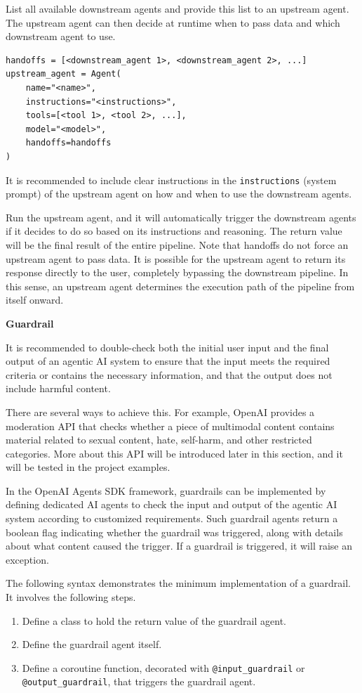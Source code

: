List all available downstream agents and provide this list to an upstream agent. The upstream agent can then decide at runtime when to pass data and which downstream agent to use.
\begin{lstlisting}
handoffs = [<downstream_agent 1>, <downstream_agent 2>, ...]
upstream_agent = Agent(
    name="<name>",
    instructions="<instructions>",
    tools=[<tool 1>, <tool 2>, ...],
    model="<model>",
    handoffs=handoffs
)
\end{lstlisting}

It is recommended to include clear instructions in the \verb|instructions| (system prompt) of the upstream agent on how and when to use the downstream agents.

Run the upstream agent, and it will automatically trigger the downstream agents if it decides to do so based on its instructions and reasoning. The return value will be the final result of the entire pipeline. Note that handoffs do not force an upstream agent to pass data. It is possible for the upstream agent to return its response directly to the user, completely bypassing the downstream pipeline. In this sense, an upstream agent determines the execution path of the pipeline from itself onward.

\vspace{0.1in}
\noindent \textbf{Guardrail}
\vspace{0.1in}

It is recommended to double-check both the initial user input and the final output of an agentic AI system to ensure that the input meets the required criteria or contains the necessary information, and that the output does not include harmful content.

There are several ways to achieve this. For example, OpenAI provides a moderation API that checks whether a piece of multimodal content contains material related to sexual content, hate, self-harm, and other restricted categories. More about this API will be introduced later in this section, and it will be tested in the project examples.

In the OpenAI Agents SDK framework, guardrails can be implemented by defining dedicated AI agents to check the input and output of the agentic AI system according to customized requirements. Such guardrail agents return a boolean flag indicating whether the guardrail was triggered, along with details about what content caused the trigger. If a guardrail is triggered, it will raise an exception.

The following syntax demonstrates the minimum implementation of a guardrail. It involves the following steps.
\begin{enumerate}
	\item Define a class to hold the return value of the guardrail agent. 
	\item Define the guardrail agent itself.  
	\item Define a coroutine function, decorated with \verb|@input_guardrail| or \verb|@output_guardrail|, that triggers the guardrail agent.
\end{enumerate}

